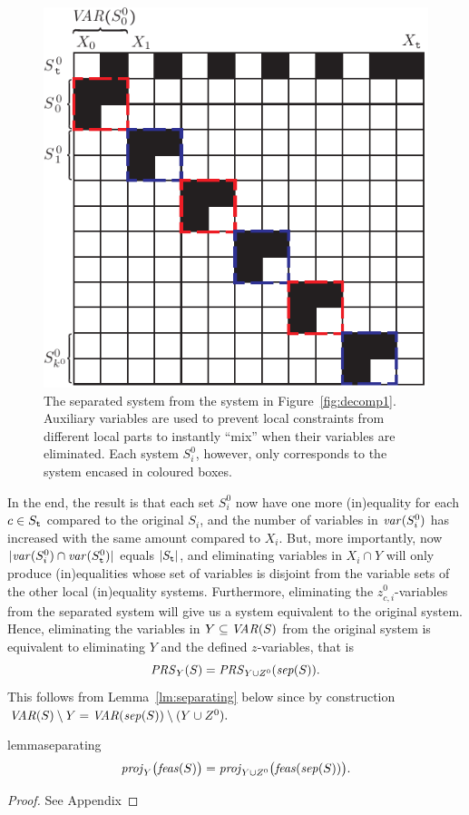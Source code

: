 \begin{figure}[htbp]
	\centering
		\includegraphics[scale = 0.8]{figures/decomp3B.pdf}
	\caption{The separated system from the system in Figure~\ref{fig:decomp1}. Auxiliary variables are used to prevent local constraints from different local parts to instantly ``mix'' when their variables are eliminated. Each system $S^0_i$, however, only corresponds to the system encased in coloured boxes.}
	\label{fig:decomp3}
\end{figure}
%
In the end, the result is that each set $S_i^0$ now have one more (in)equality for each $c \in S_{\texttt{t}}$ %
compared to the original $S_i$, and the number of variables in $\mathit{var}(S_i^0)$ has increased with the same amount compared to $X_i$.
But, more importantly, now $|\mathit{var}(S_i^0)\cap \mathit{var}(S^0_{\texttt{t}})|$ equals $|S_{\texttt{t}}|$, and eliminating variables in $X_i\cap Y$ will only produce (in)equalities whose set of variables is disjoint from the variable sets of the other local (in)equality systems.
Furthermore, eliminating the $z^0_{c,i}$-variables from the separated system 
will give us a system equivalent to the original system. 
Hence, eliminating the variables in $Y\subseteq \mathit{VAR}(S)$ from the original system is equivalent to eliminating $Y$ and the defined $z$-variables, that is 
\[
\mathit{PRS}_Y(S) = \mathit{PRS}_{Y\cup Z^0}(\mathit{sep}(S)).
\]
This follows from Lemma~\ref{lm:separating} below since by construction $\mathit{VAR}(S)\setminus Y = \mathit{VAR}(\mathit{sep}(S))\setminus (Y\cup Z^0).$
\begin{restatable}{lemma}{separating}\label{lm:separating}
\[
\mathit{proj}_Y\big(\mathit{feas}(S)\big)=\mathit{proj}_{Y\cup Z^0}\big(\mathit{feas}(\mathit{sep}(S))\big).
\]
\end{restatable}
\begin{proof}
See Appendix
\end{proof}

